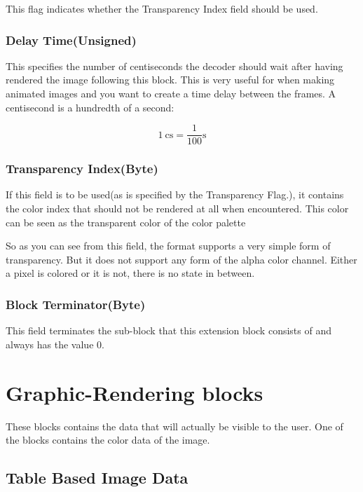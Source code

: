 This flag indicates whether the Transparency Index field should be
used.

\subsubsection{Delay Time(Unsigned)}

This specifies the number of centiseconds the decoder should wait
after having rendered the image following this block. This is very
useful for when making animated \gif images and you want to create a time
delay between the frames. A centisecond is a hundredth of a second:

\begin{equation*}
  \SI{1}{\centi\second} = \frac{1}{100}\si{\second}
\end{equation*}

\subsubsection{Transparency Index(Byte)}

If this field is to be used(as is specified by the Transparency
Flag.), it contains the color index that should not be rendered at all
when encountered. This color can be seen as the transparent color of
the color palette

So as you can see from this field, the \gif format supports a very
simple form of transparency. But it does not support any form of the
alpha color channel. Either a pixel is colored or it is not, there is
no state in between.

\subsubsection{Block Terminator(Byte)}

This field terminates the sub-block that this extension block
consists of and always has the value $0$.

\section{Graphic-Rendering blocks}

These blocks contains the data that will actually be visible to the
user. One of the blocks contains the color data of the image.

\subsection{Table Based Image Data}

